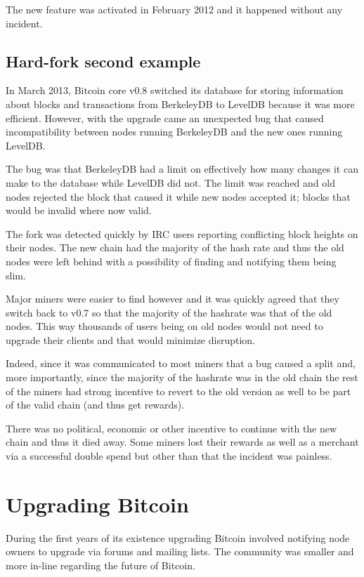 The new feature was activated in February 2012 and it happened without any incident.

\subsection*{Hard-fork second example}
In March 2013, Bitcoin core v0.8 switched its database for storing information about blocks and transactions from BerkeleyDB to LevelDB because it was more efficient. However, with the upgrade came an unexpected bug that caused incompatibility between nodes running BerkeleyDB and the new ones running LevelDB.

The bug was that BerkeleyDB had a limit on effectively how many changes it can make to the database while LevelDB did not. The limit was reached and old nodes rejected the block that caused it while new nodes accepted it; blocks that would be invalid where now valid.

The fork was detected quickly by IRC users reporting conflicting block heights on their nodes. The new chain had the majority of the hash rate and thus the old nodes were left behind with a possibility of finding and notifying them being slim.

Major miners were easier to find however and it was quickly agreed that they switch back to v0.7 so that the majority of the hashrate was that of the old nodes. This way thousands of users being on old nodes would not need to upgrade their clients and that would minimize disruption. 

Indeed, since it was communicated to most miners that a bug caused a split and, more importantly, since the majority of the hashrate was in the old chain the rest of the miners had strong incentive to revert to the old version as well to be part of the valid chain (and thus get rewards).

There was no political, economic or other incentive to continue with the new chain and thus it died away. Some miners lost their rewards as well as a merchant via a successful double spend but other than that the incident was painless.

\section{Upgrading Bitcoin}
During the first years of its existence upgrading Bitcoin involved notifying node owners to upgrade via forums and mailing lists. The community was smaller and more in-line regarding the future of Bitcoin.

